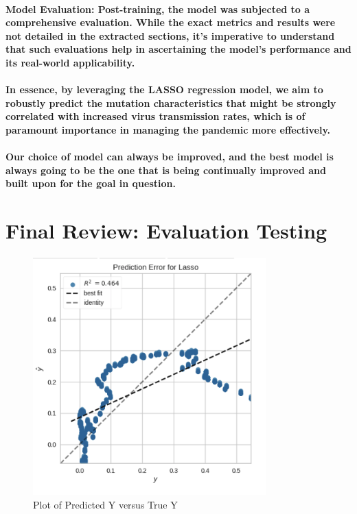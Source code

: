 \documentclass{article}
\begin{document}
\paragraph{\textbf{}}
\paragraph{\textbf{Model Evaluation}: Post-training, the model was subjected to a comprehensive evaluation. While the exact metrics and results were not detailed in the extracted sections, it's imperative to understand that such evaluations help in ascertaining the model's performance and its real-world applicability.}
\paragraph{In essence, by leveraging the LASSO regression model, we aim to robustly predict the mutation characteristics that might be strongly correlated with increased virus transmission rates, which is of paramount importance in managing the pandemic more effectively.}
\paragraph{Our choice of model can always be improved, and the best model is always going to be the one that is being continually improved and built upon for the goal in question. }
\section{Final Review: Evaluation  Testing}
\paragraph{\textbf{}}
\begin{figure}[h]
    \centering
    \includegraphics[width=0.8\textwidth]{prediction_error.png} 
    \caption{Plot of Predicted Y versus True Y}
    \label{fig:my_label_6}
\end{figure}
\end{document}
